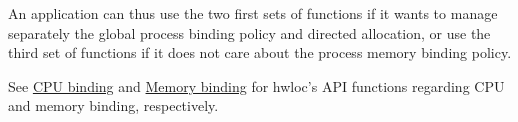 An application can thus use the two first sets of functions if it wants to manage separately the global process binding policy and directed allocation, or use the third set of functions if it does not care about the process memory binding policy.

See \hyperlink{a00049}{CPU binding} and \hyperlink{a00050}{Memory binding} for hwloc's API functions regarding CPU and memory binding, respectively. 